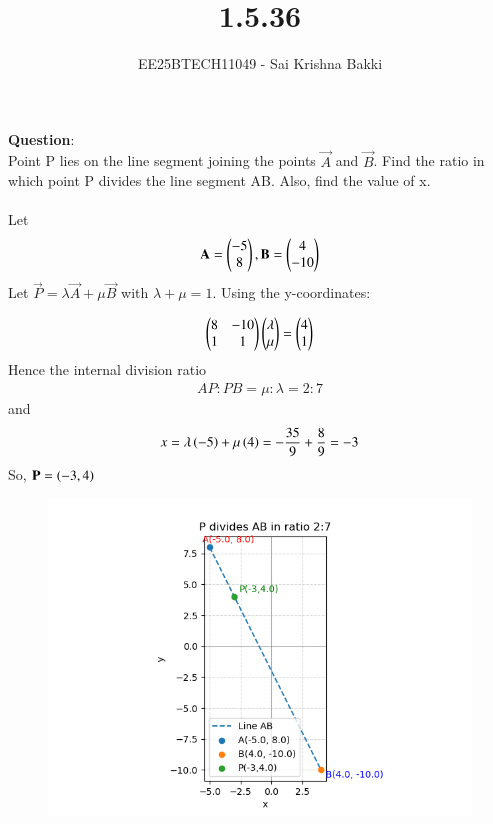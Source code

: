 \documentclass[journal]{IEEEtran}
\begin{document}

\vspace{3cm}

\title{1.5.36}
\author{EE25BTECH11049 - Sai Krishna Bakki}
 \maketitle
{\let\newpage\relax\maketitle}

\renewcommand{\thefigure}{\theenumi}
\renewcommand{\thetable}{\theenumi}
\setlength{\intextsep}{10pt} %


\renewcommand{\thetable}{\theenumi}

\textbf{Question}:\\
Point P lies on the line segment joining the points $\vec{A}$ and $\vec{B}$. Find the ratio in which point P divides the line segment AB. Also, find the value of x. \\ 
\solution \\
Let 
\begin{align*}
\mathbf{A}= \begin{pmatrix}-5 \\ 8\end{pmatrix}, \mathbf{B}= \begin{pmatrix}4 \\ -10\end{pmatrix}
\end{align*}
Let $\vec{P} = \lambda\vec{A} + \mu\vec{B}$ with $\lambda + \mu =1$. Using the y-coordinates:

\begin{align}
    \begin{pmatrix}8 & -10 \\ 1 & 1\end{pmatrix} \begin{pmatrix}\lambda \\ \mu\end{pmatrix} = \begin{pmatrix}4 \\ 1\end{pmatrix}
\end{align}
Hence the internal division ratio
\begin{align}
    AP:PB = \mu:\lambda=2:7
\end{align}
and
\begin{align}
   x=\lambda\left(-5\right)+\mu\left(4\right)= -\frac{35}{9} + \frac{8}{9} = -3
\end{align}
So, $\mathbf{P}=\left(-3,4\right)$

\begin{figure}
    \centering
    \includegraphics[width=\columnwidth]{figs/Figure.png}
\end{figure}
\end{document}
